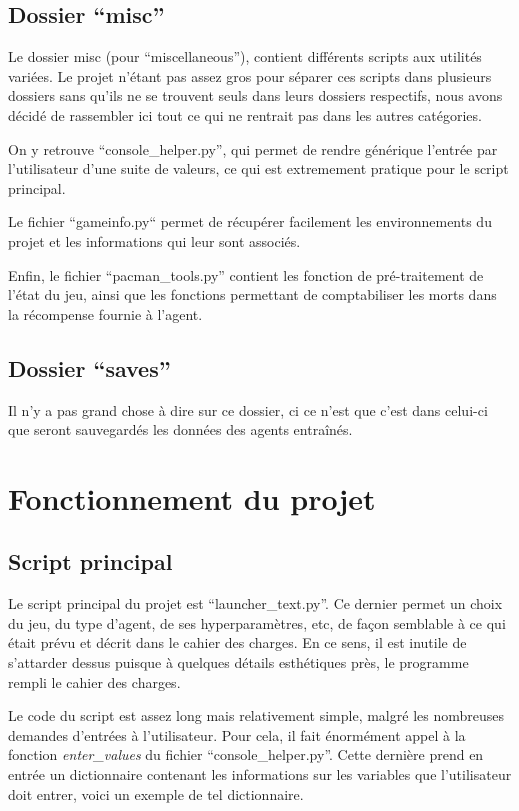 \subsection{Dossier ``misc''}
Le dossier misc (pour ``miscellaneous''), contient différents scripts aux utilités variées. Le projet n'étant pas assez gros pour séparer ces scripts dans plusieurs dossiers sans qu'ils ne se trouvent seuls dans leurs dossiers respectifs, nous avons décidé de rassembler ici tout ce qui ne rentrait pas dans les autres catégories.
\par
On y retrouve ``console\_helper.py'', qui permet de rendre générique l'entrée par l'utilisateur d'une suite de valeurs, ce qui est extremement pratique pour le script principal.
\par
Le fichier ``gameinfo.py`` permet de récupérer facilement les environnements du projet et les informations qui leur sont associés.
\par
Enfin, le fichier ``pacman\_tools.py'' contient les fonction de pré-traitement de l'état du jeu, ainsi que les fonctions permettant de comptabiliser les morts dans la récompense fournie à l'agent.

\subsection{Dossier ``saves''}
Il n'y a pas grand chose à dire sur ce dossier, ci ce n'est que c'est dans celui-ci que seront sauvegardés les données des agents entraînés.


\section{Fonctionnement du projet}

\subsection{Script principal}
Le script principal du projet est ``launcher\_text.py''. Ce dernier permet un choix du jeu, du type d'agent, de ses hyperparamètres, etc, de façon semblable à ce qui était prévu et décrit dans le cahier des charges. En ce sens, il est inutile de s'attarder dessus puisque à quelques détails esthétiques près, le programme rempli le cahier des charges.
\par
Le code du script est assez long mais relativement simple, malgré les nombreuses demandes d'entrées à l'utilisateur. Pour cela, il fait énormément appel à la fonction \textit{enter\_values} du fichier ``console\_helper.py''. Cette dernière prend en entrée un dictionnaire contenant les informations sur les variables que l'utilisateur doit entrer, voici un exemple de tel dictionnaire.

